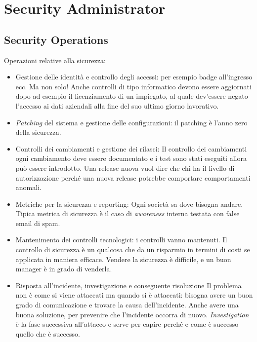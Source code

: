 
\chapter{Security Administrator}
\label{SA}

\section{Security Operations}
\label{SA:SO}

Operazioni relative alla sicurezza:
\begin{itemize}
\item Gestione delle identità e controllo degli accessi: per esempio badge 
all'ingresso ecc. Ma non solo! Anche controlli di tipo informatico devono essere 
aggiornati dopo ad esempio il licenziamento di un impiegato, al quale dev'essere 
negato l'accesso ai dati aziendali alla fine del suo ultimo giorno lavorativo.
\item \textit{Patching} del sistema e gestione delle configurazioni: il patching 
è l'anno zero della sicurezza.
\item Controlli dei cambiamenti e gestione dei rilasci: Il controllo dei 
cambiamenti ogni cambiamento deve essere documentato e i test sono stati 
eseguiti allora può essere introdotto.
Una release nuova vuol dire che chi ha il livello di autorizzazione perché una 
nuova release potrebbe comportare comportamenti anomali.
\item Metriche per la sicurezza e reporting: Ogni società sa dove bisogna 
andare. Tipica metrica di sicurezza è il caso di \emph{awareness} interna 
testata con false email di spam. 
\item Mantenimento dei controlli tecnologici: i controlli vanno mantenuti. 
Il controllo di sicurezza è un qualcosa che da un risparmio in termini di costi 
se applicata in maniera efficace. Vendere la sicurezza è difficile, e un buon 
manager è in grado di venderla.

\item Risposta all'incidente, investigazione e conseguente risoluzione
Il problema non è come si viene attaccati ma quando si è attaccati: bisogna 
avere un buon grado di comunicazione e trovare la causa dell'incidente. Anche 
avere una buona soluzione, per prevenire che l'incidente occorra di nuovo.
\textit{Investigation} è la fase successiva all'attacco e serve per capire 
perché e come è successo quello che è successo.

\end{itemize}


